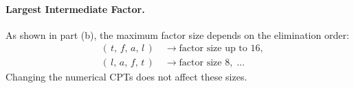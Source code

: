 \documentclass[11pt]{article}
\begin{document}
\paragraph{Largest Intermediate Factor.}
As shown in part (b), the maximum factor size depends on the elimination order:
\[
\begin{aligned}
&(\,t,\,f,\,a,\,l\,)\quad\rightarrow\text{factor size up to }16,\\
&(\,l,\,a,\,f,\,t\,)\quad\rightarrow\text{factor size }8,\;\dots
\end{aligned}
\]
Changing the numerical CPTs does not affect these sizes.
\end{document}
